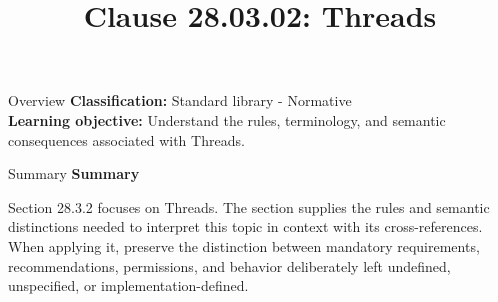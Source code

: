 \documentclass[10pt,letterpaper]{article}
\title{Clause 28.03.02: Threads}
\author{}
\date{}
\begin{document}
\maketitle
\begin{CornellOverviewBox}{Overview}
\textbf{Classification:} Standard library - Normative\\[2pt]
\textbf{Learning objective:} Understand the rules, terminology, and semantic consequences associated with Threads.
\end{CornellOverviewBox}\begin{CornellSummaryBox}{Summary}
{\sffamily\bfseries\color{Accent} Summary}\par\vspace{3pt}Section 28.3.2 focuses on Threads. The section supplies the rules and semantic distinctions needed to interpret this topic in context with its cross-references. When applying it, preserve the distinction between mandatory requirements, recommendations, permissions, and behavior deliberately left undefined, unspecified, or implementation-defined.
\end{CornellSummaryBox}
\end{document}
